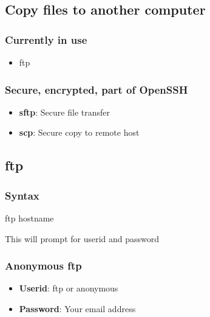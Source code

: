 \documentclass{report}
\begin{document}
    \pagebreak 
    \subsection{Copy files to another computer}

    \bigbreak \noindent 
    \subsubsection{Currently in use}
    \begin{itemize}
        \item ftp
    \end{itemize}

    \bigbreak \noindent 
    \subsubsection{Secure, encrypted, part of OpenSSH}
    \bigbreak \noindent 
    \begin{itemize}
        \item \textbf{sftp}: Secure file transfer
        \item \textbf{scp}: Secure copy to remote host
    \end{itemize}

    \bigbreak \noindent 
    \subsection{ftp}
    \bigbreak \noindent 
    \subsubsection{Syntax}
    \bigbreak \noindent 
    \begin{bashcode}
        ftp hostname
    \end{bashcode}
    \bigbreak \noindent 
    This will prompt for userid and password

    \bigbreak \noindent 
    \subsubsection{Anonymous ftp}
    \bigbreak \noindent 
    \begin{itemize}
        \item \textbf{Userid}: ftp or anonymous
        \item \textbf{Password}: Your email address
    \end{itemize}

    \bigbreak \noindent 
\end{document}
